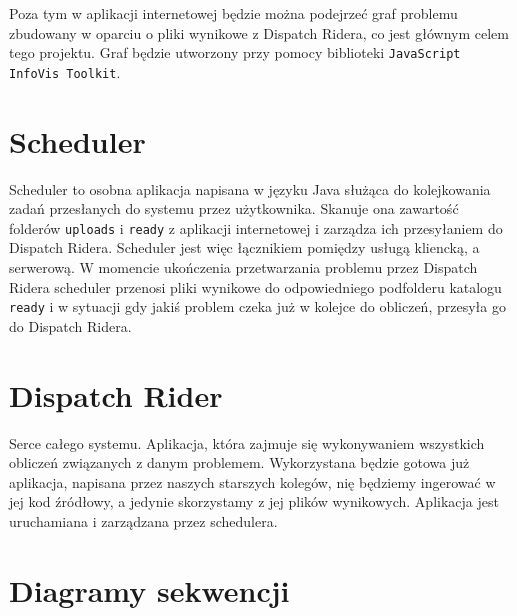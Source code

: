 Poza tym w aplikacji internetowej będzie można podejrzeć graf problemu zbudowany w oparciu o pliki
wynikowe z Dispatch Ridera, co jest głównym celem tego projektu. Graf będzie utworzony przy pomocy
biblioteki \texttt{JavaScript InfoVis Toolkit}.

\section{Scheduler}
Scheduler to osobna aplikacja napisana w języku Java służąca do kolejkowania zadań przesłanych do systemu
przez użytkownika. Skanuje ona zawartość folderów \texttt{uploads} i \texttt{ready} z aplikacji internetowej
i zarządza ich przesyłaniem do Dispatch Ridera. Scheduler jest więc łącznikiem pomiędzy usługą kliencką,
a serwerową. W momencie ukończenia przetwarzania problemu przez Dispatch Ridera scheduler przenosi pliki
wynikowe do odpowiedniego podfolderu katalogu \texttt{ready} i w sytuacji gdy jakiś problem czeka już w kolejce
do obliczeń, przesyła go do Dispatch Ridera.

\section{Dispatch Rider}
Serce całego systemu. Aplikacja, która zajmuje się wykonywaniem wszystkich obliczeń związanych z danym problemem.
Wykorzystana będzie gotowa już aplikacja, napisana przez naszych starszych kolegów, nię będziemy
ingerować w jej kod źródłowy, a jedynie skorzystamy z jej plików wynikowych. Aplikacja jest uruchamiana i zarządzana przez schedulera.

\section{Diagramy sekwencji}
